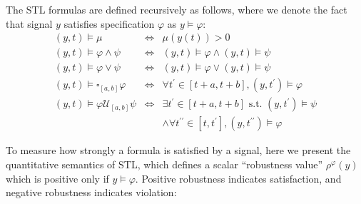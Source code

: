 \documentclass[a4paper]{report}
\begin{document}
The STL formulas are defined recursively as follows, where we denote the fact that signal $y$ satisfies specification $\varphi$ as $y \models \varphi $:
\begin{equation}
    \begin{array}{lll}(y, t) \models \mu & \Leftrightarrow & \mu(y(t))>0 \\ (y, t) \models \varphi \wedge \psi & \Leftrightarrow & (y, t) \models \varphi \wedge(y, t) \models \psi \\ (y, t) \models \varphi \vee \psi & \Leftrightarrow & (y, t) \models \varphi \vee(y, t) \models \psi \\ (y, t) \models \square_{[a, b]} \varphi & \Leftrightarrow & \forall t^{\prime} \in[t+a, t+b],\left(y, t^{\prime}\right) \models \varphi \\ (y, t) \models \varphi \mathcal{U}_{[a, b]} \psi & \Leftrightarrow & \exists t^{\prime} \in[t+a, t+b] \text { s.t. }\left(y, t^{\prime}\right) \models \psi \\ & & \wedge \forall t^{\prime \prime} \in\left[t, t^{\prime}\right],\left (y, t^{\prime \prime} \right) \models \varphi\end{array}
\end{equation}

To measure how strongly a formula is satisfied by a signal,
here we present the quantitative semantics of STL, which defines a scalar “robustness value” $\rho^ \varphi(y)$ which is positive only if $y \vDash \varphi$. 
Positive robustness indicates satisfaction, and negative robustness indicates violation:
\end{document}
